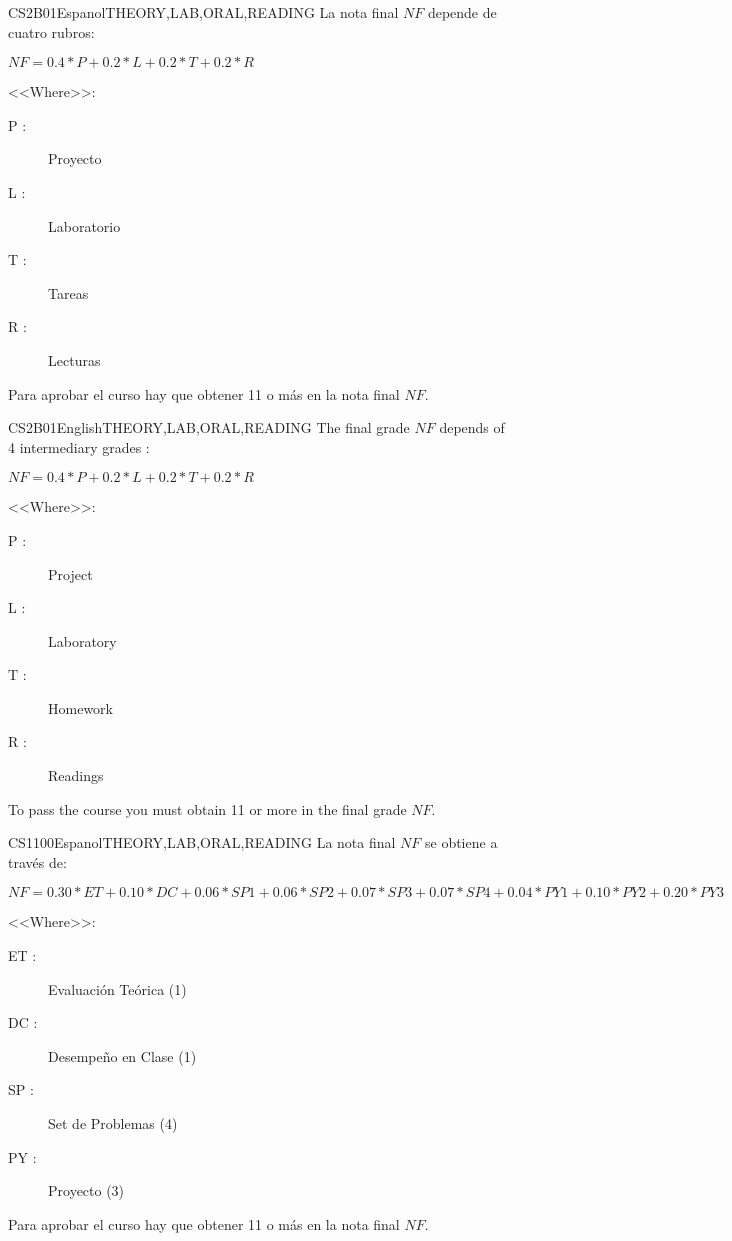 \begin{evaluation}{CS2B01}{Espanol}{THEORY,LAB,ORAL,READING}
La nota final $NF$ depende de cuatro rubros:

  $ NF = 0.4*P + 0.2*L + 0.2*T + 0.2*R $

<<Where>>:
  \begin{description}
		\item[P :] Proyecto
		\item[L :] Laboratorio
    \item[T :] Tareas
    \item[R :] Lecturas
	\end{description}

	Para aprobar el curso hay que obtener 11 o más en la nota final $NF$.
\end{evaluation}

\begin{evaluation}{CS2B01}{English}{THEORY,LAB,ORAL,READING}
The final grade $NF$ depends of 4 intermediary grades :

  $ NF = 0.4*P + 0.2*L + 0.2*T + 0.2*R $

<<Where>>:
  \begin{description}
		\item[P :] Project
		\item[L :] Laboratory
    \item[T :] Homework
    \item[R :] Readings
	\end{description}

	To pass the course you must obtain 11 or more in the final grade $NF$.
\end{evaluation}


\begin{evaluation}{CS1100}{Espanol}{THEORY,LAB,ORAL,READING}
La nota final $NF$ se obtiene a través de:

  $ NF = 0.30*ET + 0.10*DC + 0.06*SP1 + 0.06*SP2 + 0.07*SP3 + 0.07*SP4 +0.04*PY1
   + 0.10*PY2 + 0.20*PY3 $

<<Where>>:
  \begin{description}
		\item[ET :] Evaluación Teórica (1)
		\item[DC :] Desempeño en Clase (1)
    \item[SP :] Set de Problemas (4)
    \item[PY :] Proyecto (3)
	\end{description}

	Para aprobar el curso hay que obtener 11 o más en la nota final $NF$.
\end{evaluation}

